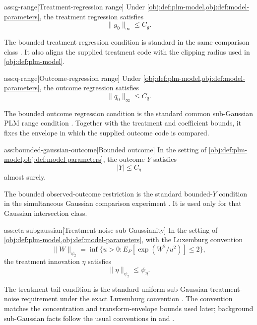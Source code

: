 \begin{assumptionv}{ass:g-range}[Treatment-regression range]
Under \cref{obj:def:plm-model,obj:def:model-parameters}, the treatment regression satisfies
\[
\|g_0\|_{\infty}\le C_g .
\]
\end{assumptionv}

The bounded treatment regression condition is standard in the same comparison class \citep{JinMackeySyrgkanis2025}. It also aligns the supplied treatment code with the clipping radius used in \cref{obj:def:plm-model}.

\begin{assumptionv}{ass:q-range}[Outcome-regression range]
Under \cref{obj:def:plm-model,obj:def:model-parameters}, the outcome regression satisfies
\[
\|q_0\|_{\infty}\le C_q .
\]
\end{assumptionv}

The bounded outcome regression condition is the standard common sub-Gaussian PLM range condition \citep{JinMackeySyrgkanis2025}. Together with the treatment and coefficient bounds, it fixes the envelope in which the supplied outcome code is compared.

\begin{assumptionv}{ass:bounded-gaussian-outcome}[Bounded outcome]
In the setting of \cref{obj:def:plm-model,obj:def:model-parameters}, the outcome \(Y\) satisfies
\[
|Y|\le C_q
\]
almost surely.
\end{assumptionv}

The bounded observed-outcome restriction is the standard bounded-\(Y\) condition in the simultaneous Gaussian comparison experiment \citep{JinMackeySyrgkanis2025}. It is used only for that Gaussian intersection class.

\begin{assumptionv}{ass:eta-subgaussian}[Treatment-noise sub-Gaussianity]
In the setting of \cref{obj:def:plm-model,obj:def:model-parameters}, with the Luxemburg convention
\[
\lVert W\rVert_{\psi_2}
=
\inf\{u>0:E_P[\exp(W^2/u^2)]\le2\},
\]
the treatment innovation \(\eta\) satisfies
\[
\lVert \eta\rVert_{\psi_2}\le\psi_{\eta}.
\]
\end{assumptionv}

The treatment-tail condition is the standard uniform sub-Gaussian treatment-noise requirement under the exact Luxemburg convention \citep{JinMackeySyrgkanis2025}. The convention matches the concentration and transform-envelope bounds used later; background sub-Gaussian facts follow the usual conventions in \citet{Vershynin2018} and \citet{Wainwright2019}.

